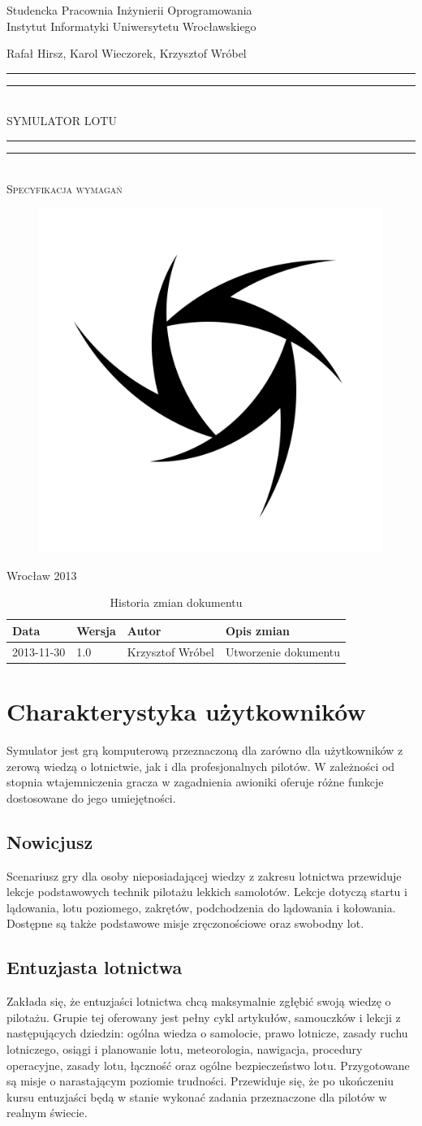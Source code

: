 \documentclass{mwrep}
\newcommand*{\titleGP}{\begingroup
\centering

{\large Studencka Pracownia Inżynierii Oprogramowania}\\Instytut Informatyki Uniwersytetu Wrocławskiego\par
\vspace*{16\baselineskip}

{\Large Rafał Hirsz, Karol Wieczorek, Krzysztof Wróbel\par}
\vspace*{\baselineskip}

\rule{\textwidth}{1.6pt}\vspace*{-\baselineskip}\vspace*{2pt}
\rule{\textwidth}{0.4pt}\\[\baselineskip]

{\Huge SYMULATOR LOTU}\\[0.2\baselineskip]

\rule{\textwidth}{0.4pt}\vspace*{-\baselineskip}\vspace{3.2pt}
\rule{\textwidth}{1.6pt}\\[\baselineskip]

\scshape
{\huge Specyfikacja wymagań}\par
\vspace*{2\baselineskip}

\begin{figure}[h]
\centering
\includegraphics[width=5\baselineskip]{flightsim-team-logo.pdf}
\end{figure}
\vfill

{\large Wrocław 2013}\par

\pagebreak

\endgroup}
\begin{document}
\thispagestyle{empty}
\titleGP

\begin{center}
\begin{table}[h]
\begin{center}
\begin{tabularx}{1\textwidth}{|l|l|l|X|}
\hline
Data & Wersja & Autor & Opis zmian \\ \hline
2013-11-30 & 1.0 & Krzysztof Wróbel & Utworzenie dokumentu \\
\hline
\end{tabularx}
\end{center}
\vspace{3ex}
\caption{Historia zmian dokumentu}\label{T:Zmiany}
\end{table}
\end{center}

\pagebreak

\tableofcontents

\chapter{Charakterystyka użytkowników}

Symulator jest grą komputerową przeznaczoną dla zarówno dla użytkowników z zerową wiedzą o lotnictwie, jak i dla profesjonalnych pilotów. W zależności od stopnia wtajemniczenia gracza w zagadnienia awioniki oferuje różne funkcje dostosowane do jego umiejętności.

\section{Nowicjusz}

Scenariusz gry dla osoby nieposiadającej wiedzy z zakresu lotnictwa przewiduje lekcje podstawowych technik pilotażu lekkich samolotów. Lekcje dotyczą startu i lądowania, lotu poziomego, zakrętów, podchodzenia do lądowania i kołowania. Dostępne są także podstawowe misje zręczonościowe oraz swobodny lot.

\section{Entuzjasta lotnictwa}

Zakłada się, że entuzjaści lotnictwa chcą maksymalnie zgłębić swoją wiedzę o pilotażu. Grupie tej oferowany jest pełny cykl artykułów, samouczków i lekcji z następujących dziedzin: ogólna wiedza o samolocie, prawo lotnicze, zasady ruchu lotniczego, osiągi i planowanie lotu, meteorologia, nawigacja, procedury operacyjne, zasady lotu, łączność oraz ogólne bezpieczeństwo lotu. Przygotowane są misje o narastającym poziomie trudności. Przewiduje się, że po ukończeniu kursu entuzjaści będą w stanie wykonać zadania przeznaczone dla pilotów w realnym świecie.
\end{document}
